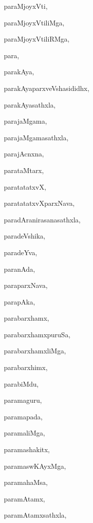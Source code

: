 \begin{multicols}{2}
{paraMjoyxVti}, \pageref{paraMjoyxVti}

{paraMjoyxVtiliMga}, \pageref{paraMjoyxVtiliMga}

{paraMjoyxVtiliRMga}, \pageref{paraMjoyxVtiliRMga}

{para}, \pageref{para}

{parakAya}, \pageref{parakAya}

{parakAyaparxveVshasididhx}, \pageref{parakAyaparxveVshasididhx}

{parakAyasathxla}, \pageref{parakAyasathxla}

{parajaMgama}, \pageref{parajaMgama}

{parajaMgamasathxla}, \pageref{parajaMgamasathxla}

{parajAcnxna}, \pageref{parajAcnxna}

{parataMtarx}, \pageref{parataMtarx}

{paratatatxvX}, \pageref{paratatatxvX}

{paratatatxvXparxNava}, \pageref{paratatatxvXparxNava}

{paradAranirasanasathxla}, \pageref{paradAranirasanasathxla}

{paradeVshika}, \pageref{paradeVshika}

{paradeYva}, \pageref{paradeYva}

{paranAda}, \pageref{paranAda}

{paraparxNava}, \pageref{paraparxNava}

{parapAka}, \pageref{parapAka}

{parabarxhamx}, \pageref{parabarxhamx}

{parabarxhamxpuruSa}, \pageref{parabarxhamxpuruSa}

{parabarxhamxliMga}, \pageref{parabarxhamxliMga}

{parabarxhimx}, \pageref{parabarxhimx}

{parabiMdu}, \pageref{parabiMdu}

{paramaguru}, \pageref{paramaguru}

{paramapada}, \pageref{paramapada}

{paramaliMga}, \pageref{paramaliMga}

{paramashakitx}, \pageref{paramashakitx}

{paramaswKAyxMga}, \pageref{paramaswKAyxMga}

{paramahaMsa}, \pageref{paramahaMsa}

{paramAtamx}, \pageref{paramAtamx}

{paramAtamxsathxla}, \pageref{paramAtamxsathxla}


\end{multicols}
